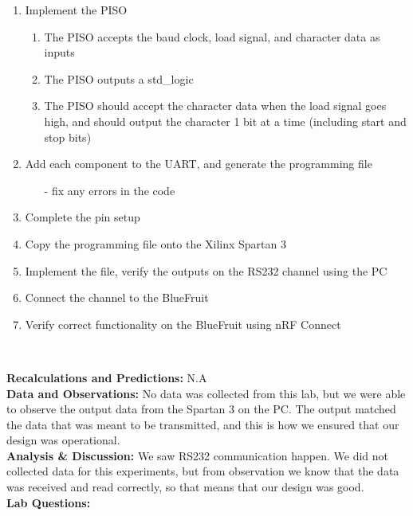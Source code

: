 \documentclass{article}
\newcommand{\sect}[1]{\noindent\textbf{#1}}
\begin{document}
\begin{enumerate}
	\item Implement the PISO
	\begin{enumerate}
		\item The PISO accepts the baud clock, load signal, and character data as inputs
		\item The PISO outputs a std\_logic
		\item The PISO should accept the character data when the load signal goes high, and should output the character 1 bit at a time (including start and stop bits)
	\end{enumerate}
	\item Add each component to the UART, and generate the programming file
	\begin{itemize}[nolistsep, noitemsep]
		\item[-] fix any errors in the code 
	\end{itemize}
	\item Complete the pin setup
	\item Copy the programming file onto the Xilinx Spartan 3
	\item Implement the file, verify the outputs on the RS232 channel using the PC
	\item Connect the channel to the BlueFruit
	\item Verify correct functionality on the BlueFruit using nRF Connect
\end{enumerate}~

\sect{Recalculations and Predictions:} N.A\\

\sect{Data and Observations:} No data was collected from this lab, but we were able to observe the output data from the Spartan 3 on the PC. The output matched the data that was meant to be transmitted, and this is how we ensured that our design was operational.\\

\sect{Analysis \& Discussion:} We saw RS232 communication happen. We did not collected data for this experiments, but from observation we know that the data was received and read correctly, so that means that our design was good.\\

\sect{Lab Questions:}
\end{document}
